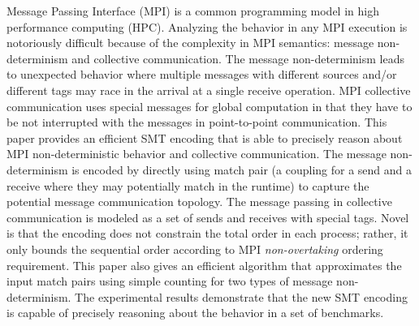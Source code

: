 Message Passing Interface (MPI) is a common programming model in high performance computing (HPC). 
Analyzing the behavior in any MPI execution is notoriously difficult because of the complexity in MPI semantics: message non-determinism and collective communication. 
The message non-determinism leads to unexpected behavior where multiple messages with different sources and/or different tags may race in the arrival at a single receive operation. 
MPI collective communication uses special messages for global computation in that they have to be not interrupted with the messages in point-to-point communication. 
This paper provides an efficient SMT encoding that is able to precisely reason about MPI non-deterministic behavior and collective communication. The message non-determinism is encoded by directly using match pair (a coupling for a send and a receive where they may potentially match in the runtime) to capture the potential message communication topology. The message passing in collective communication is modeled as a set of sends and receives with special tags. Novel is that the encoding does not constrain the total order in each process; rather, it only bounds the sequential order according to MPI \textit{non-overtaking} ordering requirement. 
This paper also gives an efficient algorithm that approximates the input match pairs using simple counting for two types of message non-determinism. 
The experimental results demonstrate that the new SMT encoding is capable of precisely reasoning about the behavior in a set of benchmarks.